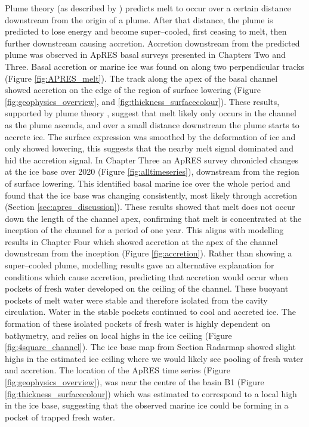 Plume theory (as described by \cite{jenkins2011convection}) predicts melt to occur over a certain distance downstream from the origin of a plume. After that distance, the plume is predicted to lose energy and become super--cooled, first ceasing to melt, then further downstream causing accretion.
Accretion downstream from the predicted plume was observed in ApRES basal surveys presented in Chapters Two and Three. Basal accretion or marine ice was found on along two perpendicular tracks (Figure \ref{fig:APRES_melt}). The track along the apex of the basal channel showed  accretion on the edge of the region of surface lowering (Figure \ref{fig:geophysics_overview}, and \ref{fig:thickness_surfacecolour}). These results, supported by plume theory \citep{jenkins1991one}, suggest that melt likely only occurs in the channel as the plume ascends, and over a small distance downstream the plume starts to accrete ice. The surface expression was smoothed by the deformation of ice and only showed lowering, this suggests that the nearby melt signal dominated and hid the accretion signal.
In Chapter Three an ApRES survey chronicled changes at the ice base over 2020 (Figure \ref{fig:alltimeseries}), downstream from the region of surface lowering. This identified basal marine ice over the whole period and found that the ice base was changing consistently, most likely through accretion (Section \ref{sec:apres_discussion}). These results showed that melt does not occur down the length of the channel apex, confirming that melt is concentrated at the inception of the channel for a period of one year.
This aligns with modelling results in Chapter Four which showed accretion at the apex of the channel downstream from the inception (Figure \ref{fig:accretion}).  Rather than showing a super--cooled plume, modelling results gave an alternative explanation for conditions which cause accretion, predicting that accretion would occur when pockets of fresh water developed on the ceiling of the channel. These buoyant pockets of melt water were stable and therefore isolated from the cavity circulation. Water in the stable pockets continued to cool and accreted ice. The formation of these isolated pockets of fresh water is highly dependent on bathymetry, and relies on local highs in the ice ceiling (Figure \ref{fig:4square_channel}). 
The ice base map from Section Radarmap showed slight highs in the estimated ice ceiling where we would likely see pooling of fresh water and accretion. The location of the ApRES time series (Figure \ref{fig:geophysics_overview}), was near the centre of the basin B1 (Figure \ref{fig:thickness_surfacecolour}) which was estimated to correspond to a local high in the ice base, suggesting that the observed marine ice could be forming in a pocket of trapped fresh water.


